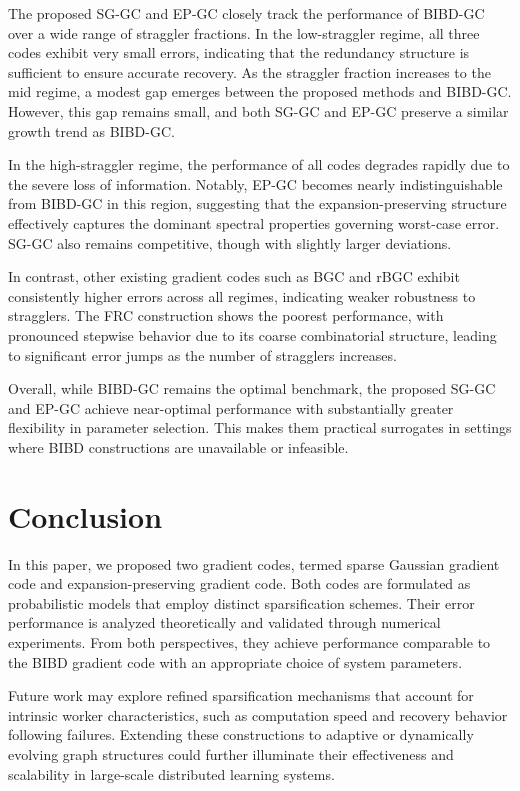 \documentclass[lettersize,journal]{IEEEtran}
\begin{document}
The proposed SG-GC and EP-GC closely track the performance of BIBD-GC over a wide range of straggler fractions. In the low-straggler regime, all three codes exhibit very small errors, indicating that the redundancy structure is sufficient to ensure accurate recovery. As the straggler fraction increases to the mid regime, a modest gap emerges between the proposed methods and BIBD-GC. However, this gap remains small, and both SG-GC and EP-GC preserve a similar growth trend as BIBD-GC.

In the high-straggler regime, the performance of all codes degrades rapidly due to the severe loss of information. Notably, EP-GC becomes nearly indistinguishable from BIBD-GC in this region, suggesting that the expansion-preserving structure effectively captures the dominant spectral properties governing worst-case error. SG-GC also remains competitive, though with slightly larger deviations.

In contrast, other existing gradient codes such as BGC and rBGC exhibit consistently higher errors across all regimes, indicating weaker robustness to stragglers. The FRC construction shows the poorest performance, with pronounced stepwise behavior due to its coarse combinatorial structure, leading to significant error jumps as the number of stragglers increases.

Overall, while BIBD-GC remains the optimal benchmark, the proposed SG-GC and EP-GC achieve near-optimal performance with substantially greater flexibility in parameter selection. This makes them practical surrogates in settings where BIBD constructions are unavailable or infeasible.


\section{Conclusion}
In this paper, we proposed two gradient codes, termed sparse Gaussian gradient code and expansion-preserving gradient code. Both codes are formulated as probabilistic models that employ distinct sparsification schemes. Their error performance is analyzed theoretically and validated through numerical experiments. From both perspectives, they achieve performance comparable to the BIBD gradient code with an appropriate choice of system parameters.

Future work may explore refined sparsification mechanisms that account for intrinsic worker characteristics, such as computation speed and recovery behavior following failures. Extending these constructions to adaptive or dynamically evolving graph structures could further illuminate their effectiveness and scalability in large-scale distributed learning systems.
\end{document}
